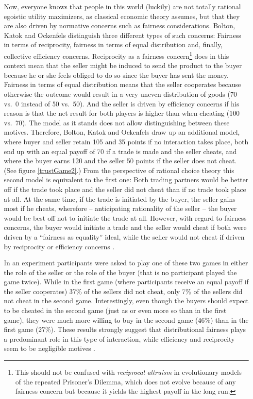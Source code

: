 Now, everyone knows that people in this world (luckily) are not totally
rational egoistic utility maximizers, as classical economic theory assumes,
but that they are also driven by normative concerns such as fairness
considerations. Bolton, Katok and Ockenfels distinguish three different types
of such concerns: Fairness in terms of reciprocity, fairness in terms of equal
distribution and, finally, collective efficiency concerns. Reciprocity as a
fairness concern\footnote{This should not be confused with {\em reciprocal
    altruism} in evolutionary models of the repeated Prisoner's Dilemma, which
  does not evolve because of any fairness concern but because it yields the
  highest payoff in the long run.} does in this context mean that the seller
might be induced to send the product to the buyer because he or she feels
obliged to do so since the buyer has sent the money. Fairness in terms of
equal distribution means that the seller cooperates because otherwise the
outcome would result in a very uneven distribution of goods (70 vs.\ 0 instead
of 50 vs.\ 50). And the seller is driven by efficiency concerns if his reason
is that the net
result for both players is higher than when cheating (100 vs.\ 70). The model as
it stands does not allow distinguishing between these motives. Therefore,
Bolton, Katok and Ockenfels draw up an additional model, where buyer and
seller retain 105 and 35 points if no interaction takes place, both end up
with an equal payoff of 70 if a trade is made and the seller cheats, and where
the buyer earns 120 and the seller 50 points if the seller does not cheat. 
(See figure \ref{trustGame2}.) From
the perspective of rational choice theory this second model is equivalent to
the first one: Both trading partners would be better off if the trade took
place and the seller did not cheat than if no trade took place at all. At the
same time, if the trade is initiated by the buyer, the seller gains most if he
cheats, wherefore -- anticipating rationality of the seller -- the buyer would be
best off not to initiate the trade at all. However, with regard to fairness
concerns, the buyer would initiate a trade and the seller would cheat if both
were driven by a ``fairness as equality'' ideal, while the seller would not cheat
if driven by reciprocity or efficiency concerns \cite[p.
191]{bolton-katok-ockenfels:2004}.

In an experiment participants were asked to play one of these two games in
either the role of the seller or the role of the buyer (that is no participant
played the game twice). While in the first game (where participants receive an
equal payoff if the seller cooperates) 37\% of the sellers did not cheat,
only 7\% of the sellers did not cheat in the second game.
Interestingly, even though the buyers should expect to be cheated in the
second game (just as or even more so than in the first game), they were much
more willing to buy in the second game (46\%) than in the first game (27\%).
These results strongly suggest that distributional fairness plays a
predominant role in this type of interaction, while efficiency and reciprocity
seem to be negligible motives \cite[p.\ 193ff.]{bolton-katok-ockenfels:2004}.

